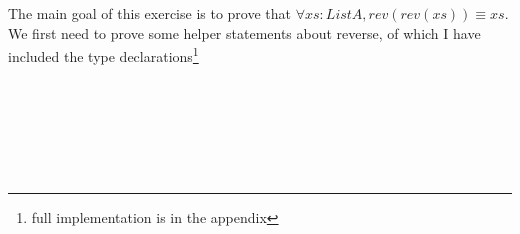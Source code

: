 \documentclass[12pt,twoside,notitlepage]{report}
\begin{document}
\begin{code}
\\
\> \AgdaSymbol{:} \AgdaSymbol{\{} \AgdaSymbol{:} \AgdaSymbol{\}}  \AgdaSymbol{(} \AgdaSymbol{)}  \AgdaSymbol{(} \AgdaSymbol{)}   \<%
\\
\> \AgdaInductiveConstructor{[]}  \AgdaSymbol{=} \<%
\\
\> \AgdaSymbol{(}  \AgdaSymbol{)}  \AgdaSymbol{=}   \AgdaSymbol{(}  \AgdaSymbol{)}\<%
\\
%
\\
\> \AgdaSymbol{:} \AgdaSymbol{\{} \AgdaSymbol{:} \AgdaSymbol{\}}      \<%
\\
\>  \AgdaSymbol{=}   \AgdaInductiveConstructor{[]}\<%
\\
\end{code}

The main goal of this exercise is to prove that $\forall xs : List A, rev (rev (xs)) \equiv xs$. We first need to prove some helper statements about reverse, of which I have included the type declarations\footnote{full implementation is in the appendix}

\begin{code}
\\
\> \AgdaSymbol{:}  \AgdaSymbol{\{}\AgdaSymbol{\}}\<%
\\
\>[0]\<[10]%
\>[10] \AgdaSymbol{(} \AgdaSymbol{:}  \AgdaSymbol{)}\<%
\\
\>[0]\<[10]%
\>[10] \AgdaSymbol{(} \AgdaSymbol{:}  \AgdaSymbol{)}\<%
\\
\>[0]\<[10]%
\>[10]     \AgdaSymbol{(} \AgdaSymbol{)} \AgdaFunction{++} \<%
\\
\end{code}
\end{document}
